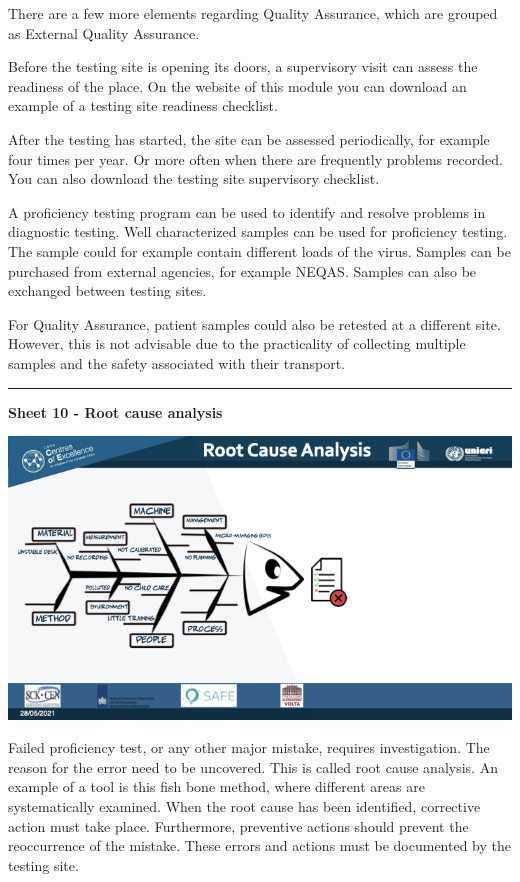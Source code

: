 \documentclass[
]{book}
\begin{document}
There are a few more elements regarding Quality Assurance, which are
grouped as External Quality Assurance.

Before the testing site is opening its doors, a supervisory visit can
assess the readiness of the place. On the website of this module you can
download an example of a testing site readiness checklist.

After the testing has started, the site can be assessed periodically,
for example four times per year. Or more often when there are frequently
problems recorded. You can also download the testing site supervisory
checklist.

A proficiency testing program can be used to identify and resolve
problems in diagnostic testing. Well characterized samples can be used
for proficiency testing. The sample could for example contain different
loads of the virus. Samples can be purchased from external agencies, for
example NEQAS. Samples can also be exchanged between testing sites.

For Quality Assurance, patient samples could also be retested at a
different site. However, this is not advisable due to the practicality
of collecting multiple samples and the safety associated with their
transport.

\begin{center}\rule{0.5\linewidth}{0.5pt}\end{center}

\textbf{Sheet 10 - Root cause analysis}

\includegraphics{images/m04/m04_Quality_management_v3.010.jpeg}

Failed proficiency test, or any other major mistake, requires
investigation. The reason for the error need to be uncovered. This is
called root cause analysis. An example of a tool is this fish bone
method, where different areas are systematically examined. When the root
cause has been identified, corrective action must take place.
Furthermore, preventive actions should prevent the reoccurrence of the
mistake. These errors and actions must be documented by the testing
site.
\end{document}
